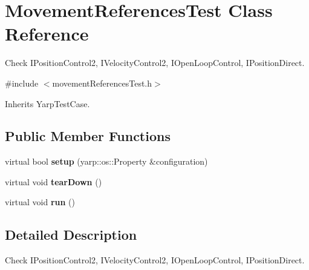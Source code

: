 \section{Movement\-References\-Test Class Reference}
\label{classMovementReferencesTest}


Check I\-Position\-Control2, I\-Velocity\-Control2, I\-Open\-Loop\-Control, I\-Position\-Direct.  




{\ttfamily \#include $<$movement\-References\-Test.\-h$>$}



Inherits Yarp\-Test\-Case.

\subsection*{Public Member Functions}
\begin{DoxyCompactItemize}
\item 
virtual bool {\bfseries setup} (yarp\-::os\-::\-Property \&configuration)\label{classMovementReferencesTest_ad9cc73f5b5865dec9d185bf4063e53a8}

\item 
virtual void {\bfseries tear\-Down} ()\label{classMovementReferencesTest_a593c8be2be3fe9bf79c7d0d7c5d817b9}

\item 
virtual void {\bfseries run} ()\label{classMovementReferencesTest_afd727ad62714859a969e5b3c47959eca}

\end{DoxyCompactItemize}


\subsection{Detailed Description}
Check I\-Position\-Control2, I\-Velocity\-Control2, I\-Open\-Loop\-Control, I\-Position\-Direct. 

